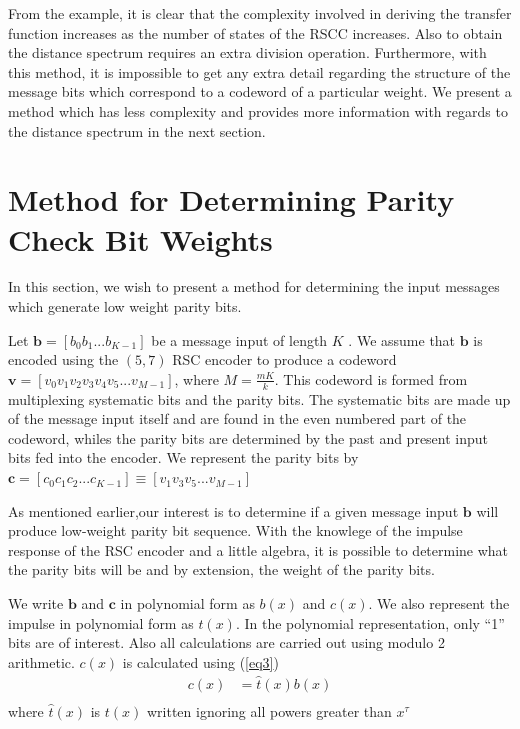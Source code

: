 \documentclass[fontsize=12pt]{article}
\begin{document}
From the example, it is clear that the complexity involved in deriving the transfer function increases as the number of states of the RSCC increases. Also to obtain the distance spectrum requires an extra division operation. Furthermore, with this method, it is impossible to get any extra detail regarding the structure of the message bits which correspond to a codeword of a particular weight. We present a method which has less complexity and provides more information with regards to the distance spectrum in the next section.

\section{Method for Determining Parity Check Bit Weights}
\label{sec3}
In this section, we wish to present a method for determining the input messages which generate low weight parity bits. 




Let $\textbf{b} =[b_0 b_1 ... b_{K-1}]$ be a message input of length $K$ . We assume that $\textbf{b}$ is encoded using the $(5,7)$ RSC encoder to produce a codeword $\textbf{v}=[v_0 v_1 v_2 v_3 v_4 v_5 ... v_{M-1}]$, where $M=\frac{mK}{k}$. This codeword is formed from multiplexing  systematic bits and the parity bits. The systematic bits are made up of the message input itself and are found in the even numbered part of the codeword, whiles the parity bits are determined by the past and present input bits fed into the encoder. 
We represent the parity bits by 
$\textbf{c}=[c_0 c_1 c_2 ... c_{K-1}] \equiv [v_1 v_3 v_5 ... v_{M-1}]$

As mentioned earlier,our interest is to determine if a given message input $\textbf{b}$ will produce low-weight parity bit sequence. With the knowlege of the impulse response of the  RSC encoder and a little algebra, it is possible to determine what the parity bits will be and by extension, the weight of the parity bits. 
 
 We write $\textbf{b}$ and $\textbf{c}$ in polynomial form as $b(x)$ and $c(x)$. We also represent the impulse in polynomial form as $t(x)$. In the polynomial representation, only ``1'' bits are of interest. Also all calculations are carried out using modulo 2 arithmetic.
$c(x)$ is calculated using (\ref{eq3})
 \begin{equation}
 \begin{split}
 c(x)&=\hat{t}(x)b(x)\\
 \end{split}
 \label{eq3}
 \end{equation}
 where $\hat{t}(x)$ is $t(x)$ written ignoring all powers greater than $x^{\tau}$
 
\end{document}
